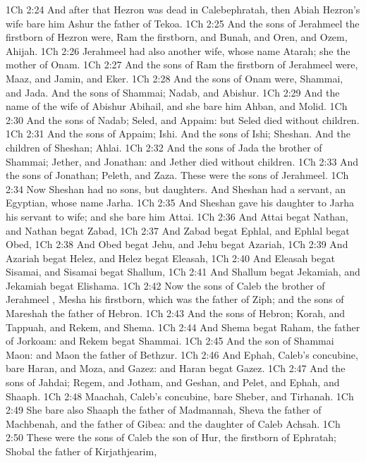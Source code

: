 \vs 1Ch 2:24 And after that Hezron was dead in Calebephratah, then Abiah Hezron's wife bare him Ashur the father of Tekoa.
\vs 1Ch 2:25 And the sons of Jerahmeel the firstborn of Hezron were, Ram the firstborn, and Bunah, and Oren, and Ozem,  Ahijah.
\vs 1Ch 2:26 Jerahmeel had also another wife, whose name  Atarah; she  the mother of Onam.
\vs 1Ch 2:27 And the sons of Ram the firstborn of Jerahmeel were, Maaz, and Jamin, and Eker.
\vs 1Ch 2:28 And the sons of Onam were, Shammai, and Jada. And the sons of Shammai; Nadab, and Abishur.
\vs 1Ch 2:29 And the name of the wife of Abishur  Abihail, and she bare him Ahban, and Molid.
\vs 1Ch 2:30 And the sons of Nadab; Seled, and Appaim: but Seled died without children.
\vs 1Ch 2:31 And the sons of Appaim; Ishi. And the sons of Ishi; Sheshan. And the children of Sheshan; Ahlai.
\vs 1Ch 2:32 And the sons of Jada the brother of Shammai; Jether, and Jonathan: and Jether died without children.
\vs 1Ch 2:33 And the sons of Jonathan; Peleth, and Zaza. These were the sons of Jerahmeel.
\vs 1Ch 2:34 Now Sheshan had no sons, but daughters. And Sheshan had a servant, an Egyptian, whose name  Jarha.
\vs 1Ch 2:35 And Sheshan gave his daughter to Jarha his servant to wife; and she bare him Attai.
\vs 1Ch 2:36 And Attai begat Nathan, and Nathan begat Zabad,
\vs 1Ch 2:37 And Zabad begat Ephlal, and Ephlal begat Obed,
\vs 1Ch 2:38 And Obed begat Jehu, and Jehu begat Azariah,
\vs 1Ch 2:39 And Azariah begat Helez, and Helez begat Eleasah,
\vs 1Ch 2:40 And Eleasah begat Sisamai, and Sisamai begat Shallum,
\vs 1Ch 2:41 And Shallum begat Jekamiah, and Jekamiah begat Elishama.
\vs 1Ch 2:42 Now the sons of Caleb the brother of Jerahmeel , Mesha his firstborn, which was the father of Ziph; and the sons of Mareshah the father of Hebron.
\vs 1Ch 2:43 And the sons of Hebron; Korah, and Tappuah, and Rekem, and Shema.
\vs 1Ch 2:44 And Shema begat Raham, the father of Jorkoam: and Rekem begat Shammai.
\vs 1Ch 2:45 And the son of Shammai  Maon: and Maon  the father of Bethzur.
\vs 1Ch 2:46 And Ephah, Caleb's concubine, bare Haran, and Moza, and Gazez: and Haran begat Gazez.
\vs 1Ch 2:47 And the sons of Jahdai; Regem, and Jotham, and Geshan, and Pelet, and Ephah, and Shaaph.
\vs 1Ch 2:48 Maachah, Caleb's concubine, bare Sheber, and Tirhanah.
\vs 1Ch 2:49 She bare also Shaaph the father of Madmannah, Sheva the father of Machbenah, and the father of Gibea: and the daughter of Caleb  Achsah.
\vs 1Ch 2:50 These were the sons of Caleb the son of Hur, the firstborn of Ephratah; Shobal the father of Kirjathjearim,
